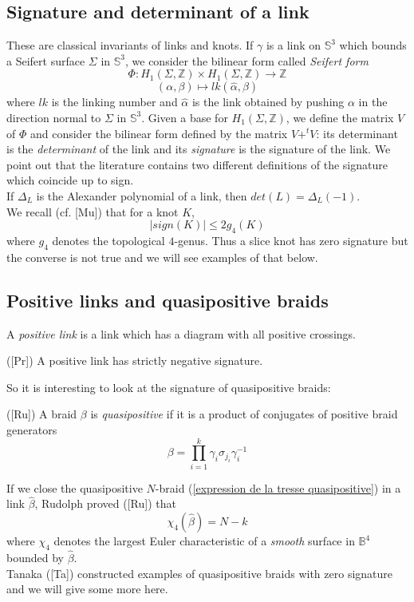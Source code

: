 \documentclass[12pt]{article}
\begin{document}
\subsection{Signature and determinant of a link}\label{definition de la signature}
These are classical invariants of links and knots. 
If $\gamma$ is a link on $\mathbb{S}^3$ which bounds a Seifert surface $\Sigma$ in $\mathbb{S}^3$, we consider the bilinear form called {\it Seifert form} $$\Phi: H_1(\Sigma,\mathbb{Z})\times H_1(\Sigma, \mathbb{Z})\longrightarrow\mathbb{Z}$$
$$(\alpha,\beta)\mapsto lk(\hat{\alpha},\beta)$$ where $lk$ is the linking number and $\hat{\alpha}$ is the link obtained by pushing $\alpha$ in the direction normal to $\Sigma$ in $\mathbb{S}^3$. Given a base for $H_1(\Sigma, \mathbb{Z})$, we define the matrix $V$ of $\Phi$ and consider the bilinear form defined by the matrix $V+^tV$: its determinant is the {\it determinant} of the link and its {\it signature} is the signature of the link. We point out that the literature contains two different definitions of the signature which coincide up to sign.\\
If $\Delta_L$ is the Alexander polynomial of a link, then $det(L)=\Delta_L(-1)$.\\ 
We recall (cf. [Mu]) that for a knot $K$, 
\begin{equation}
|sign(K)|\leq 2g_4(K)
\end{equation} where $g_4$ denotes the topological $4$-genus.  Thus a slice knot has zero signature but the converse is not true and we will see examples of that below.
\subsection{Positive links and quasipositive braids}
A {\it positive link} is a link which has a diagram with all positive crossings.
\begin{thm}([Pr])
	A positive link has strictly negative signature.
\end{thm} 
So it is interesting to look at the signature of quasipositive braids:
\begin{defn} ([Ru])
	A braid $\beta$ is {\it quasipositive} if it is a product of conjugates of positive braid generators
	\begin{equation}\label{expression de la tresse quasipositive}
	\beta=\prod_{i=1}^k\gamma_{i}\sigma_{j_i}\gamma_{i}^{-1}
	\end{equation}
\end{defn}
If we close the  quasipositive $N$-braid (\ref{expression de la tresse quasipositive}) in a link $\hat{\beta}$, Rudolph proved ([Ru]) that
\begin{equation}\label{quasipositif.link}
\chi_4(\hat{\beta})=N-k
\end{equation}
where $\chi_4$ denotes the largest Euler characteristic of a {\it smooth} surface in $\mathbb{B}^4$ bounded by $\hat{\beta}$.\\
Tanaka ([Ta]) constructed examples of quasipositive braids with zero signature and we will give some more here.
\end{document}
